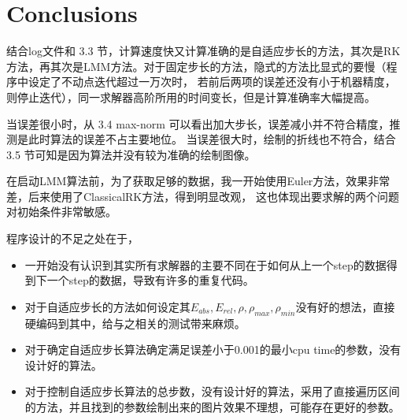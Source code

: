 \chapter{Conclusions}
\label{ch:conclusions}

结合log文件和 3.3 节，计算速度快又计算准确的是自适应步长的方法，其次是RK方法，再其次是LMM方法。对于固定步长的方法，隐式的方法比显式的要慢（程序中设定了不动点迭代超过一万次时，
若前后两项的误差还没有小于机器精度，则停止迭代），同一求解器高阶所用的时间变长，但是计算准确率大幅提高。

当误差很小时，从 3.4 max-norm 可以看出加大步长，误差减小并不符合精度，推测是此时算法的误差不占主要地位。
当误差很大时，绘制的折线也不符合，结合 3.5 节可知是因为算法并没有较为准确的绘制图像。

在启动LMM算法前，为了获取足够的数据，我一开始使用Euler方法，效果非常差，后来使用了ClassicalRK方法，得到明显改观，
这也体现出要求解的两个问题对初始条件非常敏感。

程序设计的不足之处在于，
\begin{itemize}
    \item 一开始没有认识到其实所有求解器的主要不同在于如何从上一个step的数据得到下一个step的数据，导致有许多的重复代码。
    \item 对于自适应步长的方法如何设定其$E_{abs},E_{rel},\rho,\rho_{max},\rho_{min}$没有好的想法，直接硬编码到其中，给与之相关的测试带来麻烦。
    \item 对于确定自适应步长算法确定满足误差小于0.001的最小cpu time的参数，没有设计好的算法。
    \item 对于控制自适应步长算法的总步数，没有设计好的算法，采用了直接遍历区间的方法，并且找到的参数绘制出来的图片效果不理想，可能存在更好的参数。
\end{itemize}
